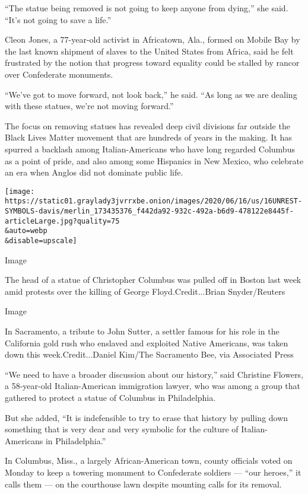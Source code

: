 ``The statue being removed is not going to keep anyone from dying,'' she
said. ``It's not going to save a life.''

Cleon Jones, a 77-year-old activist in Africatown, Ala., formed on
Mobile Bay by the last known shipment of slaves to the United States
from Africa, said he felt frustrated by the notion that progress toward
equality could be stalled by rancor over Confederate monuments.

``We've got to move forward, not look back,'' he said. ``As long as we
are dealing with these statues, we're not moving forward.''

The focus on removing statues has revealed deep civil divisions far
outside the Black Lives Matter movement that are hundreds of years in
the making. It has spurred a backlash among Italian-Americans who have
long regarded Columbus as a point of pride, and also among some
Hispanics in New Mexico, who celebrate an era when Anglos did not
dominate public life.

\texttt{[image: https://static01.graylady3jvrrxbe.onion/images/2020/06/16/us/16UNREST-SYMBOLS-davis/merlin\_173435376\_f442da92-932c-492a-b6d9-478122e8445f-articleLarge.jpg?quality=75\\\&auto=webp\\\&disable=upscale]}

Image

The head of a statue of Christopher Columbus was pulled off in Boston
last week amid protests over the killing of George Floyd.Credit...Brian
Snyder/Reuters

Image

In Sacramento, a tribute to John Sutter, a settler famous for his role
in the California gold rush who enslaved and exploited Native Americans,
was taken down this week.Credit...Daniel Kim/The Sacramento Bee, via
Associated Press

``We need to have a broader discussion about our history,'' said
Christine Flowers, a 58-year-old Italian-American immigration lawyer,
who was among a group that gathered to protect a statue of Columbus in
Philadelphia.

But she added, ``It is indefensible to try to erase that history by
pulling down something that is very dear and very symbolic for the
culture of Italian-Americans in Philadelphia.''

In Columbus, Miss., a largely African-American town, county officials
voted on Monday to keep a towering monument to Confederate soldiers ---
``our heroes,'' it calls them --- on the courthouse lawn despite
mounting calls for its removal.

